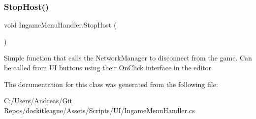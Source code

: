 \subsubsection{\texorpdfstring{Stop\+Host()}{StopHost()}}
{\footnotesize\ttfamily void Ingame\+Menu\+Handler.\+Stop\+Host (\begin{DoxyParamCaption}{ }\end{DoxyParamCaption})}



Simple function that calls the Network\+Manager to disconnect from the game. Can be called from UI buttons using their On\+Click interface in the editor 



The documentation for this class was generated from the following file\+:\begin{DoxyCompactItemize}
\item 
C\+:/\+Users/\+Andreas/\+Git Repos/dockitleague/\+Assets/\+Scripts/\+U\+I/Ingame\+Menu\+Handler.\+cs\end{DoxyCompactItemize}
